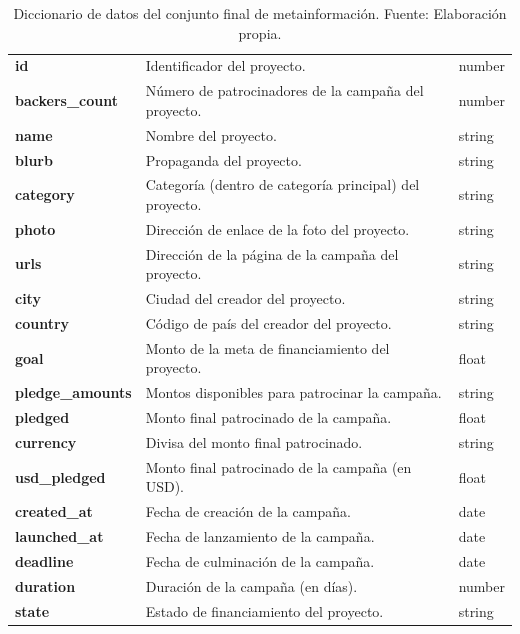 \begin{table}[h!]
	\centering
	\small
	\begin{tabular}{ |m{3cm}|m{10cm}|m{2cm}|  }
		\hline
		\rowcolor{bluejean}
		\Centering \color{white}{Variable}& \Centering \color{white}{Detalle}& \Centering \color{white}{Tipo de dato}\\
		\hline
		\textbf{id} & Identificador del proyecto. & number \\
		\hline
		\textbf{backers\_count} & Número de patrocinadores de la campaña del proyecto. & number \\
		\hline
		\textbf{name} &	Nombre del proyecto. &	string \\
		\hline
		\textbf{blurb} & Propaganda del proyecto. & string \\
		\hline
		\textbf{category} & Categoría (dentro de categoría principal) del proyecto. & string \\
		\hline
		\textbf{photo} & Dirección de enlace de la foto del proyecto. & string \\
		\hline
		\textbf{urls} & Dirección de la página de la campaña del proyecto. & string \\
		\hline
		\textbf{city} & Ciudad del creador del proyecto. & string \\
		\hline
		\textbf{country} & Código de país del creador del proyecto. & string \\
		\hline
		\textbf{goal} &	Monto de la meta de financiamiento del proyecto. &	float \\
		\hline
		\textbf{pledge\_amounts} & Montos disponibles para patrocinar la campaña. & string \\
		\hline
		\textbf{pledged} & Monto final patrocinado de la campaña. & float \\
		\hline
		\textbf{currency} & Divisa del monto final patrocinado. & string \\
		\hline
		\textbf{usd\_pledged} & Monto final patrocinado de la campaña (en USD). & float \\
		\hline
		\textbf{created\_at} & Fecha de creación de la campaña. & date \\
		\hline
		\textbf{launched\_at} & Fecha de lanzamiento de la campaña. & date \\
		\hline
		\textbf{deadline} & Fecha de culminación de la campaña. & date \\
		\hline
		\textbf{duration} &	Duración de la campaña (en días). &	number \\
		\hline
		\textbf{state} & Estado de financiamiento del proyecto. & string \\
		\hline
	\end{tabular}
	\caption{Diccionario de datos del conjunto final de metainformación. Fuente: Elaboración propia.}
	\label{4:table1}
\end{table}

